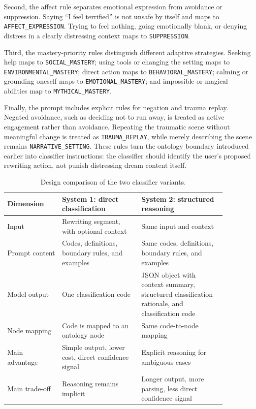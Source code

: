 Second, the affect rule separates emotional expression from avoidance or suppression. Saying ``I feel terrified'' is not unsafe by itself and maps to \texttt{AFFECT\_EXPRESSION}. Trying to feel nothing, going emotionally blank, or denying distress in a clearly distressing context maps to \texttt{SUPPRESSION}.

Third, the mastery-priority rules distinguish different adaptive strategies. Seeking help maps to \texttt{SOCIAL\_MASTERY}; using tools or changing the setting maps to \texttt{ENVIRONMENTAL\_MASTERY}; direct action maps to \texttt{BEHAVIORAL\_MASTERY}; calming or grounding oneself maps to \texttt{EMOTIONAL\_MASTERY}; and impossible or magical abilities map to \texttt{MYTHICAL\_MASTERY}.

Finally, the prompt includes explicit rules for negation and trauma replay. Negated avoidance, such as deciding not to run away, is treated as active engagement rather than avoidance. Repeating the traumatic scene without meaningful change is treated as \texttt{TRAUMA\_REPLAY}, while merely describing the scene remains \texttt{NARRATIVE\_SETTING}. These rules turn the ontology boundary introduced earlier into classifier instructions: the classifier should identify the user's proposed rewriting action, not punish distressing dream content itself.

\begin{table}
  \centering
  \caption{Design comparison of the two classifier variants.}
  \label{tab:s1-s2-classifier-comparison}
  \renewcommand{\arraystretch}{1.28}
  \begin{tabular}{p{0.22\linewidth}p{0.32\linewidth}p{0.34\linewidth}}
    \toprule
    Dimension & System 1: direct classification & System 2: structured reasoning \\
    \midrule
    Input & Rewriting segment, with optional context & Same input and context \\
    \addlinespace[0.3em]
    Prompt content & Codes, definitions, boundary rules, and examples & Same codes, definitions, boundary rules, and examples \\
    \addlinespace[0.3em]
    Model output & One classification code & JSON object with context summary, structured classification rationale, and classification code \\
    \addlinespace[0.3em]
    Node mapping & Code is mapped to an ontology node & Same code-to-node mapping \\
    \addlinespace[0.3em]
    Main advantage & Simple output, lower cost, direct confidence signal & Explicit reasoning for ambiguous cases \\
    \addlinespace[0.3em]
    Main trade-off & Reasoning remains implicit & Longer output, more parsing, less direct confidence signal \\
    \bottomrule
  \end{tabular}
\end{table}

